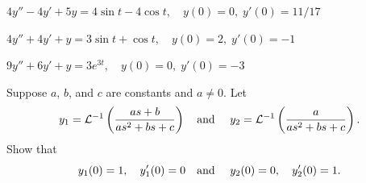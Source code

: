 \begin{exerciselist}
  \item\label{exer:8.3.35} $4y''-4y'+5y=4\sin t-4\cos t,\quad y(0)=0,\;y'(0)=11/17$

  \item\label{exer:8.3.36} $4y''+4y'+y=3\sin t+\cos t,\quad y(0)=2,\;y'(0)=-1$

  \item\label{exer:8.3.37} $9y''+6y'+y=3e^{3t},\quad y(0)=0,\;y'(0)=-3$

  \item\label{exer:8.3.38} Suppose $a$, $b$, and $c$ are constants and $a\ne0$. Let
  \[
    y_{1}={\cal L}^{-1}\left(\frac{as+b}{as^{2}+bs+c}\right)\mbox{\quad and \quad}y_{2}={\cal L}^{-1}\left(\frac{a}{as^{2}+bs+c}\right).
  \]
  Show that
  \[
    y_{1}(0)=1,\quad y_{1}'(0)=0\mbox{\quad and \quad}y_{2}(0)=0,\quad y_{2}'(0)=1.
  \]
\end{exerciselist}
